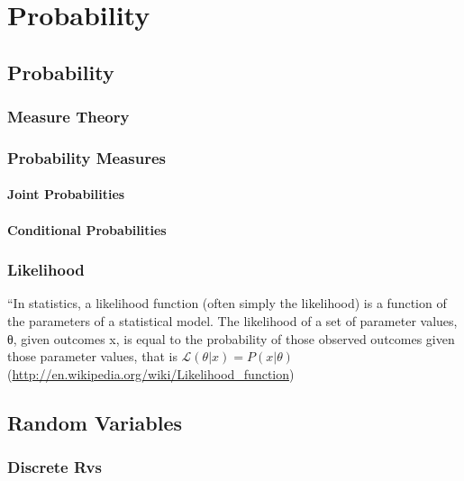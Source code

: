 \part{Probability}

\chapter{Probability}

\section{Measure Theory}

\section{Probability Measures}

\subsection{Joint Probabilities}

\subsection{Conditional Probabilities}

\section{Likelihood}

``In statistics, a likelihood function (often simply the likelihood)
is a function of the parameters of a statistical model. The likelihood
of a set of parameter values, θ, given outcomes x, is equal to the
probability of those observed outcomes given those parameter values,
that is $\mathcal{L}(\theta |x) = P(x | \theta)$
(\url{http://en.wikipedia.org/wiki/Likelihood_function})

\chapter{Random Variables}

\section{Discrete Rvs}

